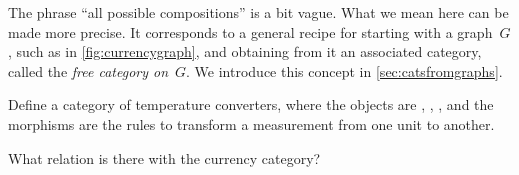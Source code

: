 The phrase ``all possible compositions'' is a bit vague. What we mean here can be made more precise. It corresponds to a general recipe for starting with a graph~$G$, such as in \cref{fig:currencygraph}, and obtaining from it an associated category, called the \emph{free category on}~$G$. We introduce this concept in \cref{sec:catsfromgraphs}.


\begin{exercise}[Temperatures]
  Define a category of temperature converters, where the objects are
  , , , and the
  morphisms are the rules to transform a measurement from one unit to another.

  What relation is there with the currency category?

\end{exercise}


